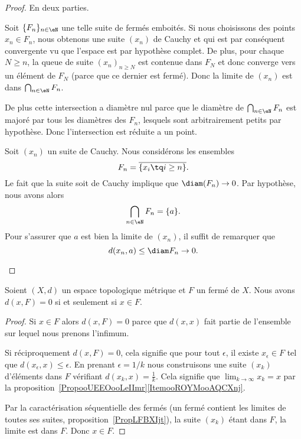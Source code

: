 \begin{proof}
	En deux parties.
	\begin{subproof}

		Soit \( \{ F_n \}_{n\in \eN}\) une telle suite de fermés emboités. Si nous choisissons des points \( x_n\in F_n\), nous obtenons une suite \( (x_n)\) de Cauchy et qui est par conséquent convergente vu que l'espace est par hypothèse complet. De plus, pour chaque \( N\geq n\), la queue de suite \( (x_n)_{n\geq N}\) est contenue dans \( F_N\) et donc converge vers un élément de \( F_N\) (parce que ce dernier est fermé). Donc la limite de \( (x_n)\) est dans \( \bigcap_{n\in \eN}F_n\).

		De plus cette intersection a diamètre nul parce que le diamètre de \( \bigcap_{n\in \eN}F_n\) est majoré par tous les diamètres des \( F_n\), lesquels sont arbitrairement petits par hypothèse. Donc l'intersection est réduite a un point.


		Soit \( (x_n)\) un suite de Cauchy. Nous considérons les ensembles
		\begin{equation}
			F_n=\overline{ \{ x_i\tq i\geq n \} }.
		\end{equation}
		Le fait que la suite soit de Cauchy implique que \( \diam(F_n)\to 0\). Par hypothèse, nous avons alors
		\begin{equation}
			\bigcap_{n\in \eN}F_n=\{ a \}.
		\end{equation}
		Pour s'assurer que \( a\) est bien la limite de \( (x_n)\), il suffit de remarquer que
		\begin{equation}
			d(x_n,a)\leq \diam F_n\to 0.
		\end{equation}
	\end{subproof}
\end{proof}

\begin{proposition}     \label{PropGULUooNzqZKj}
	Soient \( (X,d) \) un espace topologique métrique et \( F\) un fermé de \( X\). Nous avons \( d(x,F)=0\) si et seulement si \( x\in F\).
\end{proposition}

\begin{proof}
	Si \( x\in F\) alors \( d(x,F)=0\) parce que \( d(x,x)\) fait partie de l'ensemble sur lequel nous prenons l'infimum.

	Si réciproquement \( d(x,F)=0\), cela signifie que pour tout \( \epsilon\), il existe \( x_{\epsilon}\in F\) tel que \( d(x_{\epsilon},x)\leq \epsilon\). En prenant \(\epsilon=1/k\) nous construisons une suite \( (x_k)\) d'éléments dans \( F\) vérifiant \( d(x_k,x)=\frac{1}{ k }\). Cela signifie que \( \lim_{k\to \infty} x_k=x\) par la proposition~\ref{PropooUEEOooLeIImr}\ref{ItemooROYMooAQCXnj}.

	Par la caractérisation séquentielle des fermés (un fermé contient les limites de toutes ses suites, proposition~\ref{PropLFBXIjt}), la suite \( (x_k)\) étant dans \( F\), la limite est dans \( F\). Donc \( x\in F\).
\end{proof}


